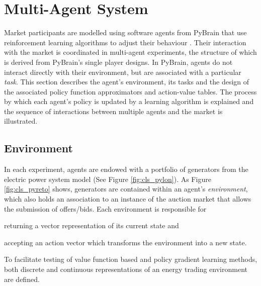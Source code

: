\newpage
\section{Multi-Agent System}
\label{sec:mas}
Market participants are modelled using software agents from PyBrain that use
reinforcement learning algorithms to adjust their behaviour \cite{schaul:2010}.
Their interaction with the market is coordinated in multi-agent experiments,
the structure of which is derived from PyBrain's single player designs.  In
PyBrain, agents do not interact directly with their environment, but are
associated with a particular \textit{task}.  This section describes the
agent's environment, its tasks and the design of the associated policy function
approximators and action-value tables. The process by which each agent's
policy is updated by a learning algorithm is explained and the sequence of
interactions between multiple agents and the market is illustrated.

\subsection{Environment}
In each experiment, agents are endowed with a portfolio of generators from the
electric power system model (See Figure \ref{fig:cls_pylon}).  As Figure
\ref{fig:cls_pyreto} shows, generators are contained within an agent's
\textit{environment}, which also holds an association to an instance of the
auction market that allows the submission of offers/bids. Each environment is
responsible for \begin{inparaenum}[(i)]
\item returning a vector representation of its current state and \item
accepting an action vector which transforms the environment into a new state.
\end{inparaenum}  To facilitate testing of value function based and policy
gradient learning methods, both discrete and continuous representations of an
energy trading environment are defined.
%

